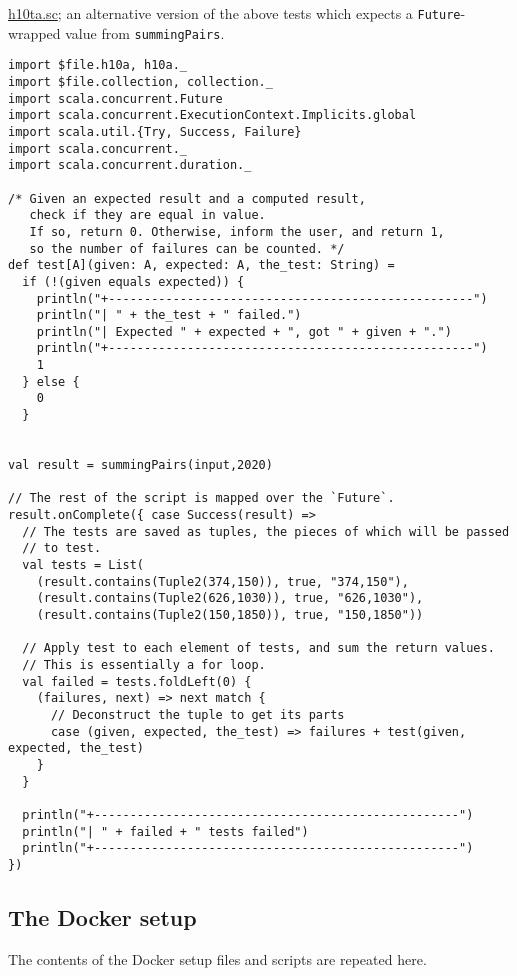 \documentclass[11pt]{article}
\begin{document}
\href{./testing/h10/h10ta.sc}{h10ta.sc}; an alternative version of the above tests
which expects a \texttt{Future}-wrapped value from \texttt{summingPairs}.
\begin{verbatim}
import $file.h10a, h10a._
import $file.collection, collection._
import scala.concurrent.Future
import scala.concurrent.ExecutionContext.Implicits.global
import scala.util.{Try, Success, Failure}
import scala.concurrent._
import scala.concurrent.duration._

/* Given an expected result and a computed result,
   check if they are equal in value.
   If so, return 0. Otherwise, inform the user, and return 1,
   so the number of failures can be counted. */
def test[A](given: A, expected: A, the_test: String) =
  if (!(given equals expected)) {
    println("+---------------------------------------------------")
    println("| " + the_test + " failed.")
    println("| Expected " + expected + ", got " + given + ".")
    println("+---------------------------------------------------")
    1
  } else {
    0
  }


val result = summingPairs(input,2020)

// The rest of the script is mapped over the `Future`.
result.onComplete({ case Success(result) =>
  // The tests are saved as tuples, the pieces of which will be passed
  // to test.
  val tests = List(
    (result.contains(Tuple2(374,150)), true, "374,150"),
    (result.contains(Tuple2(626,1030)), true, "626,1030"),
    (result.contains(Tuple2(150,1850)), true, "150,1850"))
  
  // Apply test to each element of tests, and sum the return values.
  // This is essentially a for loop.
  val failed = tests.foldLeft(0) {
    (failures, next) => next match {
      // Deconstruct the tuple to get its parts
      case (given, expected, the_test) => failures + test(given, expected, the_test)
    }
  }

  println("+---------------------------------------------------")
  println("| " + failed + " tests failed")
  println("+---------------------------------------------------")
})
\end{verbatim}


\subsection*{The Docker setup}
\label{sec:orga511aa6}
The contents of the Docker setup files and scripts are repeated here.
\end{document}
